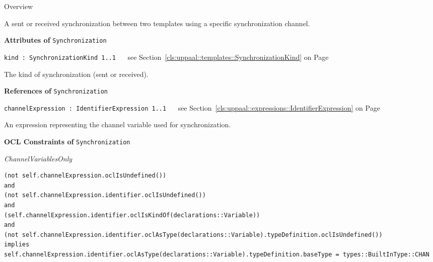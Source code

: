 	\begin{longdescription}
		\item[Overview] 		
				

	

		A sent or received synchronization between two templates using a specific synchronization channel.		
		
	
			\item[\textbf{Attributes of} \texttt{Synchronization}] ~
			\begin{longdescription}
	\item[\texttt{kind : SynchronizationKind 	\symbol{"5B}1..1\symbol{"5D}
}] ~
	see Section~\ref{cls:uppaal::templates::SynchronizationKind} on Page~\pageref{cls:uppaal::templates::SynchronizationKind}
	
	\nopagebreak
		
				

	

		The kind of synchronization (sent or received).		
			\end{longdescription}
			\item[\textbf{References of} \texttt{Synchronization}] ~
			\begin{longdescription}
	\item[\texttt{channelExpression : IdentifierExpression 	\symbol{"5B}1..1\symbol{"5D}
}] ~
	see Section~\ref{cls:uppaal::expressions::IdentifierExpression} on Page~\pageref{cls:uppaal::expressions::IdentifierExpression}
	
	\nopagebreak
		
				

	

		An expression representing the channel variable used for synchronization.		
			\end{longdescription}
			\item[\textbf{OCL Constraints of} \texttt{Synchronization}] ~
			\begin{longdescription}
	\item[\small\textit{ChannelVariablesOnly}] ~ 
	\nopagebreak
	
		\begin{lstlisting}[breaklines=true]
(not self.channelExpression.oclIsUndefined())
and
(not self.channelExpression.identifier.oclIsUndefined())
and
(self.channelExpression.identifier.oclIsKindOf(declarations::Variable))
and
(not self.channelExpression.identifier.oclAsType(declarations::Variable).typeDefinition.oclIsUndefined())
implies
self.channelExpression.identifier.oclAsType(declarations::Variable).typeDefinition.baseType = types::BuiltInType::CHAN		\end{lstlisting}
			\end{longdescription}
	
	\end{longdescription}
	

